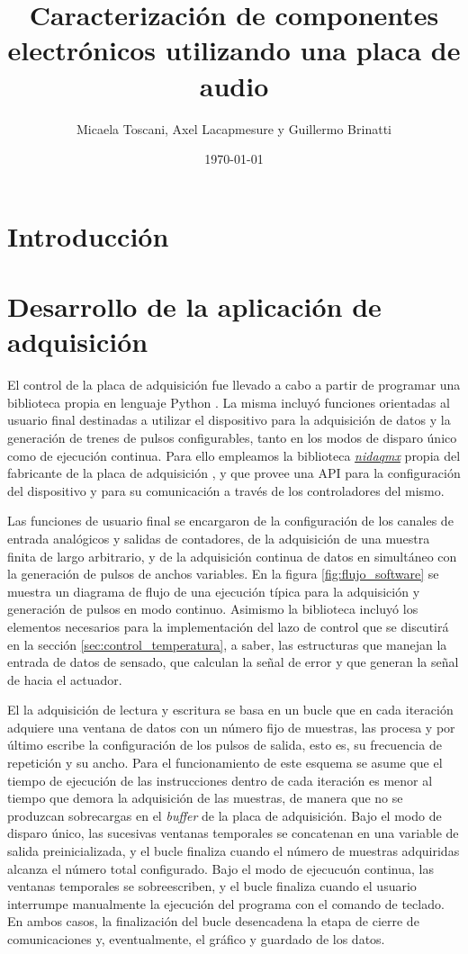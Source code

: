 \documentclass[a4paper,11pt]{article}
\title{Caracterización de componentes electrónicos utilizando una placa de audio}
\date{\today}
\author{Micaela Toscani, Axel Lacapmesure y Guillermo Brinatti}
\begin{document}
\maketitle



\section{Introducción}

\section{Desarrollo de la aplicación de adquisición}
\label{sec:software}

	El control de la placa de adquisición fue llevado a cabo a partir de programar una biblioteca propia en lenguaje Python \cite{repo}. La misma incluyó funciones orientadas al usuario final destinadas a utilizar el dispositivo para la adquisición de datos y la generación de trenes de pulsos configurables, tanto en los modos de disparo único como de ejecución continua. Para ello empleamos la biblioteca \emph{\href{https://nidaqmx-python.readthedocs.io}{nidaqmx}} propia del fabricante de la placa de adquisición \cite{nidaqmx}, y que provee una API para la configuración del dispositivo y para su comunicación a través de los controladores del mismo.
	
	Las funciones de usuario final se encargaron de la configuración de los canales de entrada analógicos y salidas de contadores, de la adquisición de una muestra finita de largo arbitrario, y de la adquisición continua de datos en simultáneo con la generación de pulsos de anchos variables. En la figura \ref{fig:flujo_software} se muestra un diagrama de flujo de una ejecución típica para la adquisición y generación de pulsos en modo continuo. Asimismo la biblioteca incluyó los elementos necesarios para la implementación del lazo de control que se discutirá en la sección \ref{sec:control_temperatura}, a saber, las estructuras que manejan la entrada de datos de sensado, que calculan la señal de error y que generan la señal de hacia el actuador.
	
	El la adquisición de lectura y escritura se basa en un bucle que en cada iteración adquiere una ventana de datos con un número fijo de muestras, las procesa y por último escribe la configuración de los pulsos de salida, esto es, su frecuencia de repetición y su ancho. Para el funcionamiento de este esquema se asume que el tiempo de ejecución de las instrucciones dentro de cada iteración es menor al tiempo que demora la adquisición de las muestras, de manera que no se produzcan sobrecargas en el \emph{buffer} de la placa de adquisición. Bajo el modo de disparo único, las sucesivas ventanas temporales se concatenan en una variable de salida preinicializada, y el bucle finaliza cuando el número de muestras adquiridas alcanza el número total configurado. Bajo el modo de ejecucuón continua, las ventanas temporales se sobreescriben, y el bucle finaliza cuando el usuario interrumpe manualmente la ejecución del programa con el comando de teclado. En ambos casos, la finalización del bucle desencadena la etapa de cierre de comunicaciones y, eventualmente, el gráfico y guardado de los datos.
	
\end{document}
